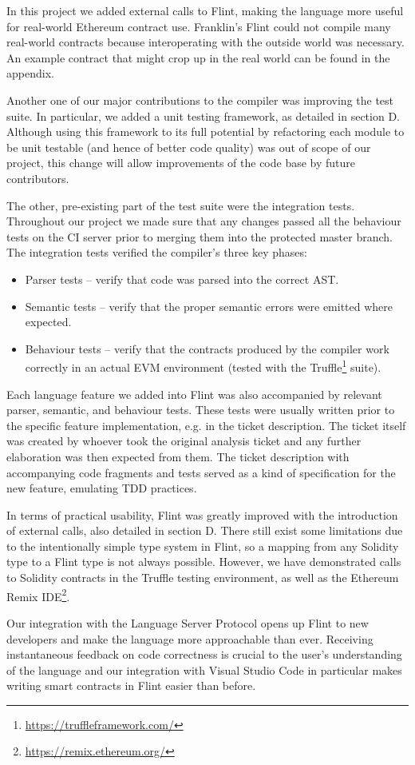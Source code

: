 In this project we added external calls to Flint, making the language more useful for real-world Ethereum contract use. Franklin's Flint could not compile many real-world contracts because interoperating with the outside world was necessary. An example contract that might crop up in the real world can be found in the appendix.

Another one of our major contributions to the compiler was improving the test suite. In particular, we added a unit testing framework, as detailed in section D. Although using this framework to its full potential by refactoring each module to be unit testable (and hence of better code quality) was out of scope of our project, this change will allow improvements of the code base by future contributors.

The other, pre-existing part of the test suite were the integration tests. Throughout our project we made sure that any changes passed all the behaviour tests on the CI server prior to merging them into the protected master branch. The integration tests verified the compiler’s three key phases:

\begin{itemize}
	\item Parser tests – verify that code was parsed into the correct AST.
	\item Semantic tests – verify that the proper semantic errors were emitted where expected.
	\item Behaviour tests – verify that the contracts produced by the compiler work correctly in an actual EVM environment (tested with the Truffle\footnote{\url{https://truffleframework.com/}} suite).
\end{itemize}

Each language feature we added into Flint was also accompanied by relevant parser, semantic, and behaviour tests. These tests were usually written prior to the specific feature implementation, e.g. in the ticket description. The ticket itself was created by whoever took the original analysis ticket and any further elaboration was then expected from them. The ticket description with accompanying code fragments and tests served as a kind of specification for the new feature, emulating TDD practices.

In terms of practical usability, Flint was greatly improved with the introduction of external calls, also detailed in section D. There still exist some limitations due to the intentionally simple type system in Flint, so a mapping from any Solidity type to a Flint type is not always possible. However, we have demonstrated calls to Solidity contracts in the Truffle testing environment, as well as the Ethereum Remix IDE\footnote{\url{https://remix.ethereum.org/}}.

Our integration with the Language Server Protocol opens up Flint to new developers and make the language more approachable than ever. Receiving instantaneous feedback on code correctness is crucial to the user’s understanding of the language and our integration with Visual Studio Code in particular makes writing smart contracts in Flint easier than before.
